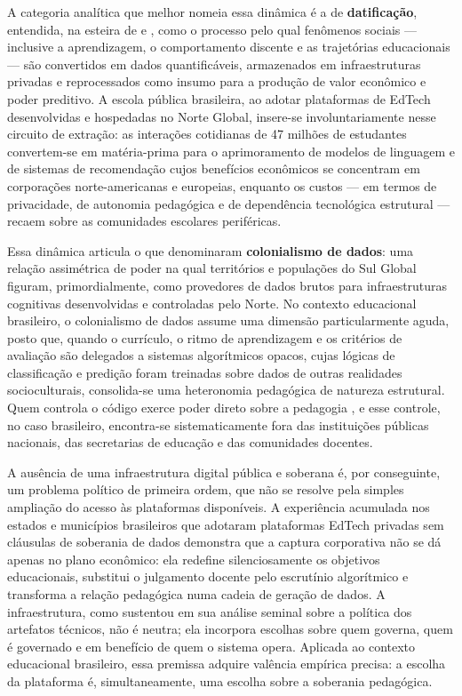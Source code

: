 \documentclass[preprint,12pt,authoryear]{elsarticle}
\begin{document}
A categoria analítica que melhor nomeia essa dinâmica é a de
\textbf{datificação}, entendida, na esteira de \citet{VanDijck2014}
e \citet{Zuboff2019}, como o processo pelo qual fenômenos sociais
— inclusive a aprendizagem, o comportamento discente e as trajetórias
educacionais — são convertidos em dados quantificáveis, armazenados
em infraestruturas privadas e reprocessados como insumo para a
produção de valor econômico e poder preditivo. A escola pública
brasileira, ao adotar plataformas de EdTech desenvolvidas e
hospedadas no Norte Global, insere-se involuntariamente nesse
circuito de extração: as interações cotidianas de 47 milhões de
estudantes convertem-se em matéria-prima para o aprimoramento
de modelos de linguagem e de sistemas de recomendação cujos
benefícios econômicos se concentram em corporações norte-americanas
e europeias, enquanto os custos — em termos de privacidade, de
autonomia pedagógica e de dependência tecnológica estrutural —
recaem sobre as comunidades escolares periféricas.

Essa dinâmica articula o que \citet{CouldryCM2019} denominaram
\textbf{colonialismo de dados}: uma relação assimétrica de poder
na qual territórios e populações do Sul Global figuram, primordialmente,
como provedores de dados brutos para infraestruturas cognitivas
desenvolvidas e controladas pelo Norte. No contexto educacional
brasileiro, o colonialismo de dados assume uma dimensão particularmente
aguda, posto que, quando o currículo, o ritmo de aprendizagem e os
critérios de avaliação são delegados a sistemas algorítmicos opacos,
cujas lógicas de classificação e predição foram treinadas sobre dados
de outras realidades socioculturais, consolida-se uma heteronomia
pedagógica de natureza estrutural. Quem controla o código exerce
poder direto sobre a pedagogia \citep{Noble2018}, e esse controle,
no caso brasileiro, encontra-se sistematicamente fora das instituições
públicas nacionais, das secretarias de educação e das comunidades
docentes.

A ausência de uma infraestrutura digital pública e soberana é, por
conseguinte, um problema político de primeira ordem, que não se
resolve pela simples ampliação do acesso às plataformas disponíveis.
A experiência acumulada nos estados e municípios brasileiros que
adotaram plataformas EdTech privadas sem cláusulas de soberania de
dados demonstra que a captura corporativa não se dá apenas no plano
econômico: ela redefine silenciosamente os objetivos educacionais,
substitui o julgamento docente pelo escrutínio algorítmico e
transforma a relação pedagógica numa cadeia de geração de dados.
A infraestrutura, como sustentou \citet{Winner1980} em sua análise
seminal sobre a política dos artefatos técnicos, não é neutra; ela
incorpora escolhas sobre quem governa, quem é governado e em
benefício de quem o sistema opera. Aplicada ao contexto educacional
brasileiro, essa premissa adquire valência empírica precisa: a
escolha da plataforma é, simultaneamente, uma escolha sobre a
soberania pedagógica.
\end{document}
